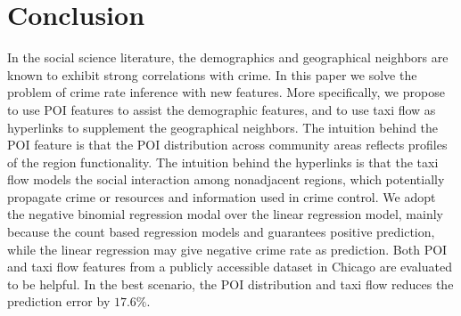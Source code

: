 
\section{Conclusion}
\label{ch2-sec:conclusion}

In the social science literature, the demographics and geographical neighbors are known to exhibit strong correlations with crime.
In this paper we solve the problem of crime rate inference with new features. More specifically, we propose to use POI features to assist the demographic features, and to use taxi flow as hyperlinks to supplement the geographical neighbors.  The intuition behind the POI feature is that the POI distribution across community areas reflects profiles of the region functionality. The intuition behind the hyperlinks is that the taxi flow models the social interaction among nonadjacent regions, which potentially propagate crime or resources and information used in crime control. We adopt the negative binomial regression modal over the linear regression model, mainly because the count based regression models and guarantees positive prediction, while the linear regression may give negative crime rate as prediction.  Both POI and taxi flow features from a publicly accessible dataset in Chicago are evaluated to be helpful. In the best scenario, the POI distribution and taxi flow reduces the prediction error by $17.6\%$. 

